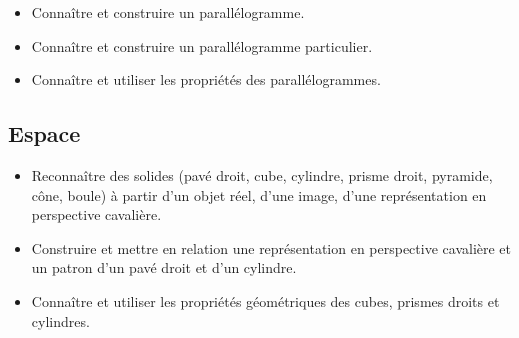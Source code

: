 \documentclass[a4paper,12pt,fleqn]{article}	
\begin{document}
\begin{itemize}
	\item {}Connaître et construire un parallélogramme.
	\item {}Connaître et construire un parallélogramme particulier.
	\item {}Connaître et utiliser les propriétés des parallélogrammes.
\end{itemize}

\subsection*{Espace}

\begin{itemize}
	\item {}Reconnaître des solides (pavé droit, cube, cylindre, prisme droit, pyramide, cône, boule) à partir d’un objet réel, d’une image, d’une représentation en perspective cavalière.
	\item {}Construire et mettre en relation une représentation en perspective cavalière et un patron d’un pavé droit et d’un cylindre.
    \item{}Connaître et utiliser les propriétés géométriques des cubes, prismes droits et cylindres.
\end{itemize}
	
\end{document}

